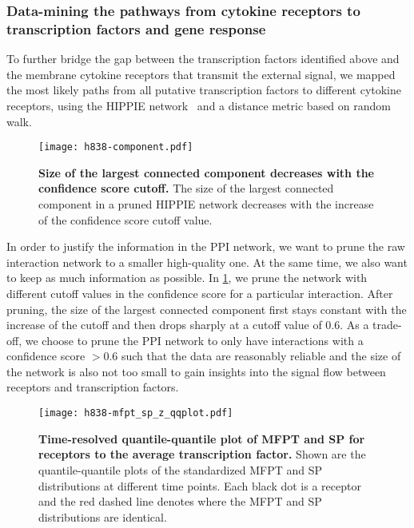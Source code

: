 \subsubsection{Data-mining the pathways from cytokine receptors to transcription factors and gene response}

To further bridge the gap between the transcription factors identified above and the membrane cytokine receptors that 
transmit the external signal,
we mapped the most likely paths from all putative 
transcription factors to different cytokine receptors, 
using the HIPPIE network~\citep{Schaefer2012} and a 
distance metric based on random walk.

\begin{figure}[!ht]
\begin{center}
\texttt{[image: h838-component.pdf]}
\end{center}
\caption[Confidence score cutoff]{
{\bf Size of the largest connected component decreases with the confidence
score cutoff.} 
The size of the largest connected component in a pruned HIPPIE network decreases
with the increase of the confidence score cutoff value.
}
\label{fig:h838_component}
\end{figure}

In order to justify the information in the PPI network, we want to prune the
raw interaction network to a smaller
high-quality one. At the same time, we also want to keep as 
much information as possible. In \ref{fig:h838_component}, we prune the 
network with different cutoff values in the confidence score for a particular
interaction. After pruning, the
size of the largest connected component first stays constant with the increase 
of the cutoff and then drops
sharply at a cutoff value of 0.6. As a trade-off, we choose to prune the PPI network
to only have interactions with a confidence score $>0.6$ such that the data
are reasonably reliable and the size of the network is also not too small to
gain insights into the signal flow between receptors and transcription factors.

\begin{figure}[!ht]
\begin{center}
\texttt{[image: h838-mfpt\_sp\_z\_qqplot.pdf]}
\end{center}
\caption[MFPT and SP distribution]{
{\bf Time-resolved quantile-quantile plot of MFPT and SP for receptors to the 
average transcription factor.} 
Shown are the quantile-quantile plots of the standardized MFPT and SP distributions at 
different time points. Each black dot is a receptor and the 
red dashed line denotes where the MFPT and SP distributions
are identical.
}
\label{fig:h838_mfpt_sp}
\end{figure}

